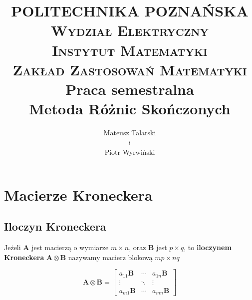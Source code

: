 \documentclass[a4paper]{article}
\title{\normalsize \textsc{
        \Large{POLITECHNIKA POZNAŃSKA}\\
		\large{Wydział Elektryczny}\\
		\normalsize
		Instytut Matematyki\\
		Zakład Zastosowań Matematyki
		}
    \\[4.0cm]
    \Large{Praca semestralna}\\
    [0.5cm]
    \Huge{Metoda Różnic Skończonych}
    \normalsize \vspace*{5\baselineskip}
    }
\author{Mateusz Talarski\\i\\Piotr Wyrwiński}
\date{}
\begin{document}
	\maketitle
    \thispagestyle{firstpage}
	\newpage
	
	\tableofcontents
	\newpage
	
	
	\section{Macierze Kroneckera}
	\subsection{Iloczyn Kroneckera}
		
		Jeżeli \textbf{A} jest macierzą o wymiarze $m \times n$, oraz \textbf{B} jest $p \times q$, to \textbf{iloczynem Kroneckera} $\mathbf{A \otimes B}$ nazywamy macierz blokową $mp \times nq$
		
	$$\mathbf{A \otimes B} = \begin{bmatrix} a_{11} \mathbf{B} & \cdots & a_{1n}\mathbf{B} \\ \vdots & \ddots & \vdots \\ a_{m1} \mathbf{B} & \cdots & a_{mn} \mathbf{B} \end{bmatrix}$$
	
\end{document}
